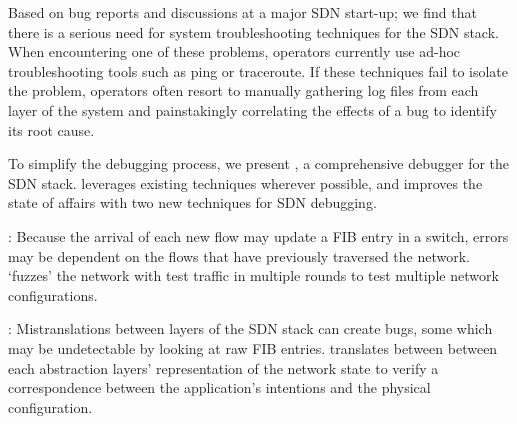 Based on bug reports and discussions at a major SDN start-up; we find that
there is a serious need for system troubleshooting techniques for the SDN
stack. When encountering one of these problems,
operators currently use ad-hoc troubleshooting tools such as ping or traceroute.
If these techniques fail to isolate the problem, operators often resort to
manually gathering log files from each layer of the system and painstakingly
correlating the effects of a bug to identify its root cause.

To simplify the debugging process, we present \projectname{}, a comprehensive debugger for the SDN stack.
\projectname{} leverages existing techniques wherever possible, and improves the state of affairs
with two new techniques for SDN debugging.


:  Because the arrival of each new flow may update a FIB entry in a switch,
 errors may be dependent on the flows that have previously traversed the network. \projectname{} `fuzzes' the network with 
test traffic in multiple rounds to test multiple network configurations.

: Mistranslations between layers of the SDN stack can create bugs, some which
may be undetectable by looking at raw FIB entries. \projectname{}
translates between between each abstraction layers' representation of the
network state to verify a correspondence between the application's intentions
and the physical configuration.


